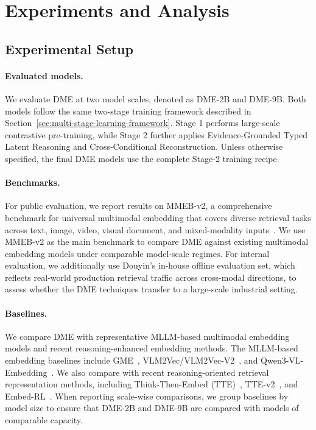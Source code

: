 

\section{Experiments and Analysis}
\label{sec:experiments}

\subsection{Experimental Setup}
\label{sec:experimental-setup}



\paragraph{Evaluated models.}
We evaluate DME at two model scales, denoted as DME-2B and DME-9B. Both models follow the same two-stage training framework described in Section~\ref{sec:multi-stage-learning-framework}. Stage 1 performs large-scale contrastive pre-training, while Stage 2 further applies Evidence-Grounded Typed Latent Reasoning and Cross-Conditional Reconstruction. Unless otherwise specified, the final DME models use the complete Stage-2 training recipe.

\paragraph{Benchmarks.}
For public evaluation, we report results on MMEB-v2, a comprehensive benchmark for universal multimodal embedding that covers diverse retrieval tasks across text, image, video, visual document, and mixed-modality inputs~\cite{MMEB,VLM2VecV2,Qwen3VLEmbedding}. We use MMEB-v2 as the main benchmark to compare DME against existing multimodal embedding models under comparable model-scale regimes. For internal evaluation, we additionally use Douyin's in-house offline evaluation set, which reflects real-world production retrieval traffic across cross-modal directions, to assess whether the DME techniques transfer to a large-scale industrial setting.


\paragraph{Baselines.}
We compare DME with representative MLLM-based multimodal embedding models and recent reasoning-enhanced embedding methods. The MLLM-based embedding baselines include GME~\cite{GME}, VLM2Vec/VLM2Vec-V2~\cite{MMEB,VLM2VecV2}, and Qwen3-VL-Embedding~\cite{Qwen3VLEmbedding}. We also compare with recent reasoning-oriented retrieval representation methods, including Think-Then-Embed (TTE)~\cite{ThinkThenEmbed}, TTE-v2~\cite{ThinkThenEmbedV2}, and Embed-RL~\cite{EmbedRL}. When reporting scale-wise comparisons, we group baselines by model size to ensure that DME-2B and DME-9B are compared with models of comparable capacity.

